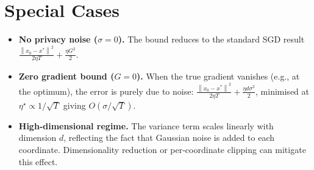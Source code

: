 \documentclass[11pt]{article}
\newcommand{\norm}[1]{\left\lVert #1 \right\rVert}
\begin{document}
\section*{Special Cases}
\begin{itemize}
    \item \textbf{No privacy noise ($\sigma=0$).} The bound reduces to the standard
    SGD result $\frac{\norm{x_{0}-x^{*}}^{2}}{2\eta T}+\frac{\eta G^{2}}{2}$.
    \item \textbf{Zero gradient bound ($G=0$).} When the true gradient vanishes
    (e.g., at the optimum), the error is purely due to noise:
    $\frac{\norm{x_{0}-x^{*}}^{2}}{2\eta T}+\frac{\eta d\sigma^{2}}{2}$,
    minimised at $\eta^{\star}\propto 1/\sqrt{T}$ giving $O(\sigma/\sqrt{T})$.
    \item \textbf{High‑dimensional regime.} The variance term scales linearly with
    dimension $d$, reflecting the fact that Gaussian noise is added to each
    coordinate.  Dimensionality reduction or per‑coordinate clipping can mitigate
    this effect.
\end{itemize}
\end{document}
